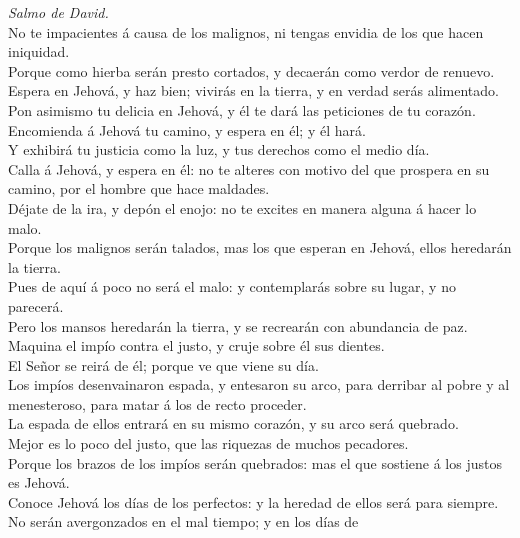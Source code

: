  \emph{Salmo de David.}\\
No te impacientes á causa de los malignos, ni tengas envidia de los que
hacen iniquidad.\\
 Porque como hierba serán presto cortados, y decaerán como
verdor de renuevo.\\
 Espera en Jehová, y haz bien; vivirás en la tierra, y en
verdad serás alimentado.\\
 Pon asimismo tu delicia en Jehová, y él te dará las
peticiones de tu corazón.\\
 Encomienda á Jehová tu camino, y espera en él; y él hará.\\
 Y exhibirá tu justicia como la luz, y tus derechos como el
medio día.\\
 Calla á Jehová, y espera en él: no te alteres con motivo
del que prospera en su camino, por el hombre que hace maldades.\\
 Déjate de la ira, y depón el enojo: no te excites en manera
alguna á hacer lo malo.\\
 Porque los malignos serán talados, mas los que esperan en
Jehová, ellos heredarán la tierra.\\
 Pues de aquí á poco no será el malo: y contemplarás sobre
su lugar, y no parecerá.\\
 Pero los mansos heredarán la tierra, y se recrearán con
abundancia de paz.\\
 Maquina el impío contra el justo, y cruje sobre él sus
dientes.\\
 El Señor se reirá de él; porque ve que viene su día.\\
 Los impíos desenvainaron espada, y entesaron su arco, para
derribar al pobre y al menesteroso, para matar á los de recto
proceder.\\
 La espada de ellos entrará en su mismo corazón, y su arco
será quebrado.\\
 Mejor es lo poco del justo, que las riquezas de muchos
pecadores.\\
 Porque los brazos de los impíos serán quebrados: mas el
que sostiene á los justos es Jehová.\\
 Conoce Jehová los días de los perfectos: y la heredad de
ellos será para siempre.\\
 No serán avergonzados en el mal tiempo; y en los días de
